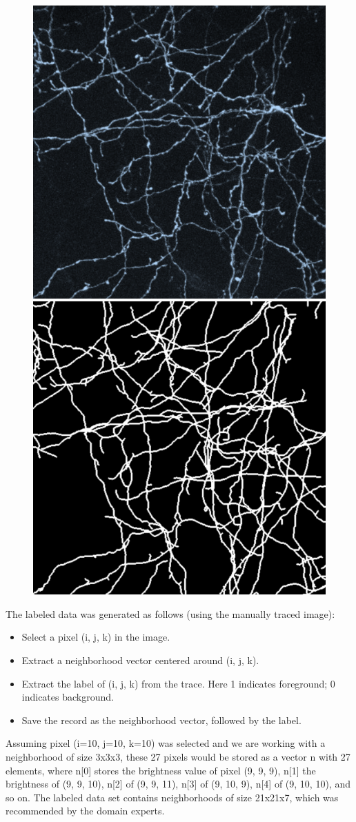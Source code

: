 \documentclass{neu_handout}
\begin{document}
\begin{figure}[h]
\centering
{
\includegraphics[width=0.2\linewidth]{image1}
\label{fig:left}
}
{
\includegraphics[width=0.2\linewidth]{image2}
\label{fig:right}
}
\end{figure}


The labeled data was generated as follows (using the manually traced image):
\newenvironment{myitemize}
{ \begin{itemize}
    \setlength{\itemsep}{0pt}
    \setlength{\parskip}{0pt}
    \setlength{\parsep}{0pt}     }
{ \end{itemize}                  } 

\begin{myitemize}
  \item Select a pixel (i, j, k) in the image.
  \item Extract a neighborhood vector centered around (i, j, k).
  \item Extract the label of (i, j, k) from the trace. Here 1 indicates foreground; 0 indicates background.
  \item  Save the record as the neighborhood vector, followed by the label.
\end{myitemize}

Assuming pixel (i=10, j=10, k=10) was selected and we are working with a neighborhood of size 3x3x3, these 27 pixels would be stored as a vector n with 27 elements, where n[0] stores the brightness value of
pixel (9, 9, 9), n[1] the brightness of (9, 9, 10), n[2] of (9, 9, 11), n[3] of (9, 10, 9), n[4] of (9, 10, 10), and so on. The labeled data set contains neighborhoods of size 21x21x7, which was recommended by the domain experts.\\
\end{document}
